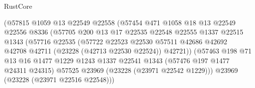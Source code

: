 \begin{lexlean}{RustCore}
\begin{coremodule}
                                    (@57815
                                      @1059
                                      @13
                                      @22549
                                      @22558
                                      (@57454
                                        @471
                                        @1058
                                        @18
                                        @13
                                        @22549
                                        @22556
                                        @8336
                                        (@57705
                                          @200
                                          @13
                                          @17
                                          @22535
                                          @22548
                                          @22555
                                          @1337
                                          @22515
                                          @1343
                                          (@57716
                                            @22535
                                            (@57722
                                              @22523
                                              @22530
                                              @57511
                                              @42686
                                              @42692
                                              @42708
                                              @42711
                                              (@23228 (@42713 @22530 @22524))
                                              @42721))
                                          (@57463
                                            @198
                                            @71
                                            @13
                                            @16
                                            @1477
                                            @1229
                                            @1243
                                            @1337
                                            @22541
                                            @1343
                                            (@57476 @197 @1477 @24311 @24315)
                                            @57525
                                            @23969
                                            (@23228 (@23971 @22542 @1229)))
                                          @23969
                                          (@23228 (@23971 @22516 @22548)))

\end{coremodule}
\end{lexlean}
